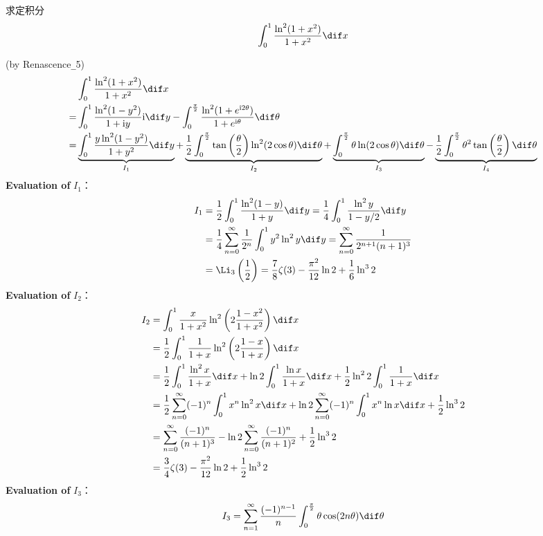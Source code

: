\documentclass[color=green,titlestyle=hang]{elegantbook}%
\begin{document}
\begin{example}
求定积分 \[\int_0^1\frac{\ln^2(1+x^2)}{1+x^2}\dif x\]
\end{example}\begin{Solution}(by Renascence\verb|_|5)
\begin{align*}
&\int_0^1\frac{\ln^2(1+x^2)}{1+x^2}\dif x\\
=&\int_0^1\frac{\ln^2(1-y^2)}{1+\mathrm{i}y}\mathrm{i}\dif y-\int_0^{\frac{\pi}{2}}\frac{\ln^2(1+e^{\mathrm{i}2\theta})}{1+e^{\mathrm{i}\theta}}\dif\theta\\
=&\underbrace{\int_0^1\frac{y\ln^2(1-y^2)}{1+y^2}\dif y}_{I_1}+\underbrace{\frac{1}{2}\int_0^{\frac{\pi}{2}}\tan\left(\frac{\theta}{2}\right)\ln^2(2\cos\theta)\dif\theta}_{I_2}+\underbrace{\int_0^{\frac{\pi}{2}}\theta\ln(2\cos\theta)\dif\theta}_{I_3}-\underbrace{\frac{1}{2}\int_0^{\frac{\pi}{2}}\theta^2\tan\left(\frac{\theta}{2}\right)\dif\theta}_{I_4}
\end{align*}
\textbf{Evaluation of} $I_1$：
\begin{align*}
I_1&=\frac{1}{2}\int_0^1\frac{\ln^2(1-y)}{1+y}\dif y=\frac{1}{4}\int_0^1\frac{\ln^2y}{1-y/2}\dif y\\
&=\frac{1}{4}\sum_{n=0}^{\infty}\frac{1}{2^n}\int_0^1y^2\ln^2y\dif y=\sum_{n=0}^{\infty}\frac{1}{2^{n+1}(n+1)^3}\\
&=\Li_3\left(\frac{1}{2}\right)=\frac{7}{8}\zeta(3)-\frac{\pi^2}{12}\ln2+\frac{1}{6}\ln^32
\end{align*}
\textbf{Evaluation of} $I_2$：
\begin{align*}
I_2&=\int_0^1\frac{x}{1+x^2}\ln^2\left(2\frac{1-x^2}{1+x^2}\right)\dif x\\
&=\frac{1}{2}\int_0^1\frac{1}{1+x}\ln^2\left(2\frac{1-x}{1+x}\right)\dif x\\
&=\frac{1}{2}\int_0^1\frac{\ln^2x}{1+x}\dif x+\ln2\int_0^1\frac{\ln x}{1+x}\dif x+\frac{1}{2}\ln^22\int_0^1\frac{1}{1+x}\dif x\\
&=\frac{1}{2}\sum_{n=0}^{\infty}(-1)^n\int_0^1x^n\ln^2x\dif x+\ln2\sum_{n=0}^{\infty}(-1)^n\int_0^1x^n\ln x\dif x+\frac{1}{2}\ln^32\\
&=\sum_{n=0}^{\infty}\frac{(-1)^n}{(n+1)^3}-\ln2\sum_{n=0}^{\infty}\frac{(-1)^n}{(n+1)^2}+\frac{1}{2}\ln^32\\
&=\frac{3}{4}\zeta(3)-\frac{\pi^2}{12}\ln2+\frac{1}{2}\ln^32
\end{align*}
\textbf{Evaluation of} $I_3$：
\begin{align*}
I_3&=\sum_{n=1}^{\infty}\frac{(-1)^{n-1}}{n}\int_0^{\frac{\pi}{2}}\theta\cos(2n\theta)\dif\theta\\

\end{align*}
\end{Solution}
\end{document}
